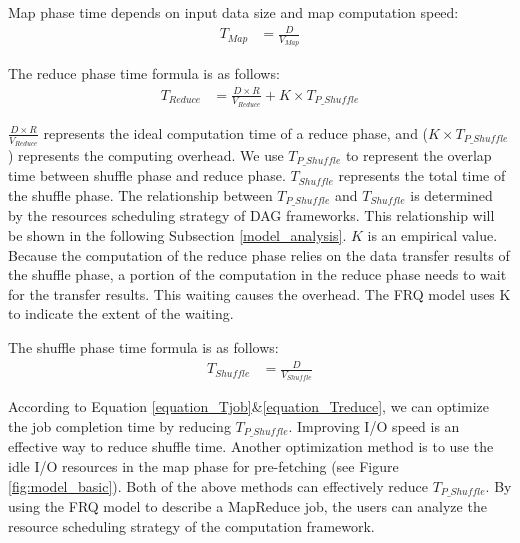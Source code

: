 {Map phase time depends on input data size and map computation speed:
\begin{equation}
\label{equation_Tmap}
\begin{aligned}
    T_{Map} &= {{\frac{D}{V_{Map}}}}
\end{aligned}
\end{equation}

The reduce phase time formula is as follows:
\begin{equation}
\label{equation_Treduce}
\begin{aligned}
    T_{Reduce} &= \frac{D \times R}{V_{Reduce}} + K \times T_{P\_Shuffle}
\end{aligned}
\end{equation}

\(\frac{D \times R}{V_{Reduce}}\) represents the ideal computation time of a reduce phase, and (\(K \times T_{P\_Shuffle}\)) represents the computing overhead.
We use \(T_{P\_Shuffle}\) to represent the overlap time between shuffle phase and reduce phase. \(T_{Shuffle}\) represents the total time of the shuffle phase. 
The relationship between \(T_{P\_Shuffle}\) and \(T_{Shuffle}\) is determined by the resources scheduling strategy of DAG frameworks. This relationship will be shown in the following Subsection \ref{model_analysis}.  
\(K\) is an empirical value. 
Because the computation of the reduce phase relies on the data transfer results of the shuffle phase, a portion of the computation in the reduce phase needs to wait for the transfer results. This waiting causes the overhead. The FRQ model uses K to indicate the extent of the waiting.

The shuffle phase time formula is as follows:
\begin{equation}
\label{equation_Tshuffle}
\begin{aligned}
    T_{Shuffle} &= {{\frac{D}{V_{Shuffle}}}}
\end{aligned}
\end{equation}

According to Equation \ref{equation_Tjob}\&\ref{equation_Treduce}, we can optimize the job completion time by reducing \(T_{P\_Shuffle}\). Improving I/O speed is an effective way to reduce shuffle time. Another optimization method is to use the idle I/O resources in the map phase for pre-fetching (see Figure \ref{fig:model_basic}). Both of the above methods can effectively reduce \(T_{P\_Shuffle}\). 
By using the FRQ model to describe a MapReduce job, the users can analyze the resource scheduling strategy of the computation framework.

}
